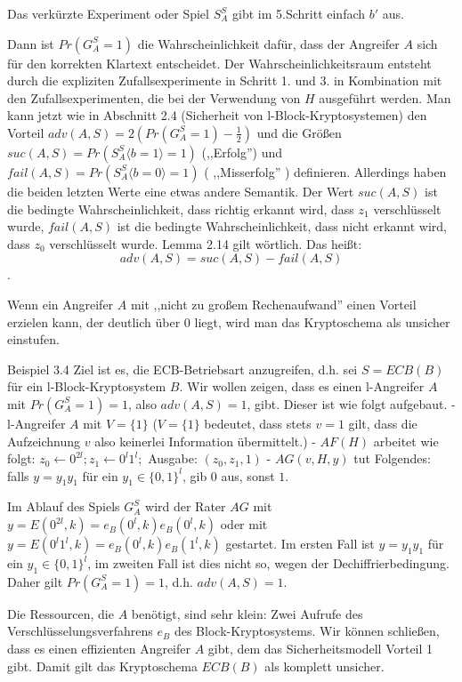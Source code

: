 \documentclass[a4paper]{article}
\begin{document}
\begin{multicols}{3}
    Das verkürzte Experiment oder Spiel $S^S_A$ gibt im 5.Schritt einfach $b'$ aus.

    Dann ist  $Pr(G^S_A = 1)$ die Wahrscheinlichkeit dafür, dass der Angreifer $A$ sich für den korrekten Klartext entscheidet. Der Wahrscheinlichkeitsraum entsteht durch die expliziten Zufallsexperimente in Schritt 1. und 3. in Kombination mit den Zufallsexperimenten, die bei der Verwendung von $H$ ausgeführt werden. Man kann jetzt wie in Abschnitt 2.4 (Sicherheit von l-Block-Kryptosystemen) den Vorteil $adv(A,S) = 2(Pr(G^S_A= 1)-\frac{1}{2})$ und die Größen $suc(A,S) = Pr(S^S_A\langle b= 1\rangle = 1)$ (,,Erfolg'') und $fail(A,S) = Pr(S_A^S\langle b= 0\rangle = 1)$ ( ,,Misserfolg'' ) definieren. Allerdings haben die beiden letzten Werte eine etwas andere Semantik. Der Wert $suc(A,S)$ ist die bedingte Wahrscheinlichkeit, dass richtig erkannt wird, dass $z_1$ verschlüsselt wurde, $fail(A,S)$ ist die bedingte Wahrscheinlichkeit, dass nicht erkannt wird, dass $z_0$ verschlüsselt wurde. Lemma 2.14 gilt wörtlich. Das heißt: $$adv(A,S) = suc(A,S)-fail(A,S)$$.

    Wenn ein Angreifer $A$ mit ,,nicht zu großem Rechenaufwand'' einen Vorteil erzielen kann, der deutlich über $0$ liegt, wird man das Kryptoschema als unsicher einstufen.

    Beispiel 3.4 Ziel ist es, die ECB-Betriebsart anzugreifen, d.h. sei $S=ECB(B)$ für ein l-Block-Kryptosystem $B$. Wir wollen zeigen, dass es einen l-Angreifer $A$ mit $Pr(G^S_A= 1) = 1$, also $adv(A,S) = 1$, gibt. Dieser ist wie folgt aufgebaut.
    - l-Angreifer $A$ mit $V=\{1\}$ ($V=\{1\}$ bedeutet, dass stets $v=1$ gilt, dass die Aufzeichnung $v$ also keinerlei Information übermittelt.)
    - $AF(H)$ arbeitet wie folgt: $z_0\leftarrow 0^{2l}; z_1\leftarrow 0^l 1^l;$ Ausgabe: $(z_0,z_1 ,1)$
    - $AG(v,H,y)$ tut Folgendes: falls $y=y_1y_1$ für ein $y_1\in\{0,1\}^l$, gib $0$ aus, sonst $1$.

    Im Ablauf des Spiels $G^S_A$ wird der Rater $AG$ mit $y=E(0^{2l},k)=e_B(0^l,k)e_B(0^l,k)$ oder mit $y=E(0^l 1^l,k)=e_B(0^l,k)e_B(1^l,k)$ gestartet. Im ersten Fall ist $y=y_1y_1$ für ein $y_1\in\{0,1\}^l$, im zweiten Fall ist dies nicht so, wegen der Dechiffrierbedingung. Daher gilt $Pr(G^S_A= 1) = 1$, d.h. $adv(A,S) = 1$.

    Die Ressourcen, die $A$ benötigt, sind sehr klein: Zwei Aufrufe des Verschlüsselungsverfahrens $e_B$ des Block-Kryptosystems. Wir können schließen, dass es einen effizienten Angreifer $A$ gibt, dem das Sicherheitsmodell Vorteil 1 gibt. Damit gilt das Kryptoschema $ECB(B)$ als komplett unsicher.


\end{multicols}
\end{document}
